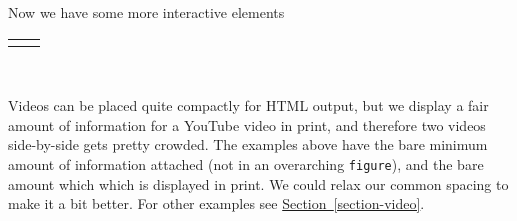 \documentclass[10pt,]{article}
\theoremstyle{plain}
\theoremstyle{definition}
\theoremstyle{definition}
\theoremstyle{definition}
\theoremstyle{definition}
\theoremstyle{definition}
\theoremstyle{definition}
\numberwithin{equation}{section}
\newlength{\panelmax}
\begin{document}
\hypertarget{p-752}{}%
Now we have some more interactive elements%
{%
\setlength{\panelmax}{0pt}
\ifdefined\panelboxAvideo\else\newsavebox{\panelboxAvideo}\fi%
\savebox{\panelboxAvideo}{%
\parbox{70pt}{[video]}}
\ifdefined\phAvideo\else\newlength{\phAvideo}\fi%
\setlength{\phAvideo}{\ht\panelboxAvideo+\dp\panelboxAvideo}
\settototalheight{\phAvideo}{\usebox{\panelboxAvideo}}
\setlength{\panelmax}{\maxof{\panelmax}{\phAvideo}}
\ifdefined\panelboxBvideo\else\newsavebox{\panelboxBvideo}\fi%
\ifdefined\phBvideo\else\newlength{\phBvideo}\fi%
\setlength{\phBvideo}{\ht\panelboxBvideo+\dp\panelboxBvideo}
\settototalheight{\phBvideo}{\usebox{\panelboxBvideo}}
\setlength{\panelmax}{\maxof{\panelmax}{\phBvideo}}
\leavevmode%
\setlength{\tabcolsep}{0.025\linewidth}
\par\medskip\noindent
\hspace*{0.05\linewidth}%
\begin{tabular}{@{}*{2}{c}@{}}
\begin{minipage}[c][\panelmax][t]{0.4\linewidth}\usebox{\panelboxAvideo}\end{minipage}&
\begin{minipage}[c][\panelmax][t]{0.45\linewidth}\usebox{\panelboxBvideo}\end{minipage}\end{tabular}\\
}%
\par
\hypertarget{p-753}{}%
Videos can be placed quite compactly for HTML output, but we display a fair amount of information for a YouTube video in print, and therefore two videos side-by-side gets pretty crowded.  The examples above have the bare minimum amount of information attached (not in an overarching \lstinline?figure?), and the bare amount which which is displayed in print.  We could relax our common spacing to make it a bit better.  For other examples see \hyperref[section-video]{Section~\ref{section-video}}.%
\end{document}
